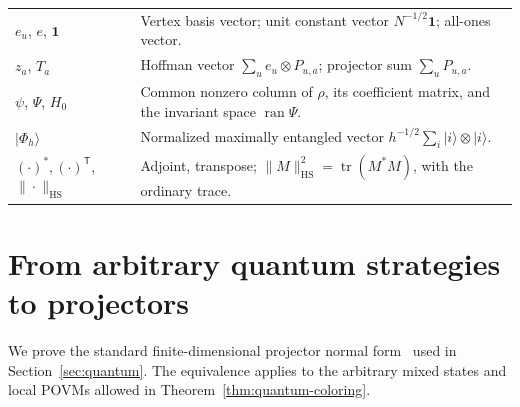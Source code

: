\documentclass[11pt,a4paper]{article}
\numberwithin{equation}{section}
\numberwithin{figure}{section}
\numberwithin{table}{section}
\numberwithin{footnote}{section}
\theoremstyle{informal}\newtheorem*{informaltheorem}{Informal theorem}
\theoremstyle{definition}\newtheorem{example}{Example}[section]
\theoremstyle{remark}\newtheorem{remark}[theorem]{Remark}
\newcommand{\one}{\mathbf 1}
\newcommand{\tr}{\operatorname{tr}}
\newcommand{\HS}{\mathrm{HS}}
\begin{document}
\begin{longtable}{@{}>{\raggedright\arraybackslash}p{.255\linewidth}>{\raggedright\arraybackslash}p{.70\linewidth}@{}}
\(e_u\), \(e\), \(\one\) & Vertex basis vector; unit constant vector \(N^{-1/2}\one\); all-ones vector.\\
\(z_a\), \(T_a\) & Hoffman vector \(\sum_u e_u\otimes P_{u,a}\); projector sum \(\sum_uP_{u,a}\).\\
\(\psi\), \(\Psi\), \(H_0\) & Common nonzero column of \(\rho\), its coefficient matrix, and the invariant space \(\operatorname{ran}\Psi\).\\
\(|\Phi_h\rangle\) & Normalized maximally entangled vector \(h^{-1/2}\sum_i|i\rangle\otimes|i\rangle\).\\
\((\cdot)^*,(\cdot)^{\mathsf T}\), \(\|\cdot\|_{\HS}\) & Adjoint, transpose; \(\|M\|_{\HS}^2=\tr(M^*M)\), with the ordinary trace.\\
\end{longtable}
\endgroup
\clearpage

\section{From arbitrary quantum strategies to projectors}\label{app:normal}
We prove the standard finite-dimensional projector normal
form~\cite[Proposition~1 and Eq.~(4)]{cmnsw} used in
Section~\ref{sec:quantum}. The equivalence applies to the arbitrary
mixed states and local POVMs allowed in
Theorem~\ref{thm:quantum-coloring}.
\end{document}
